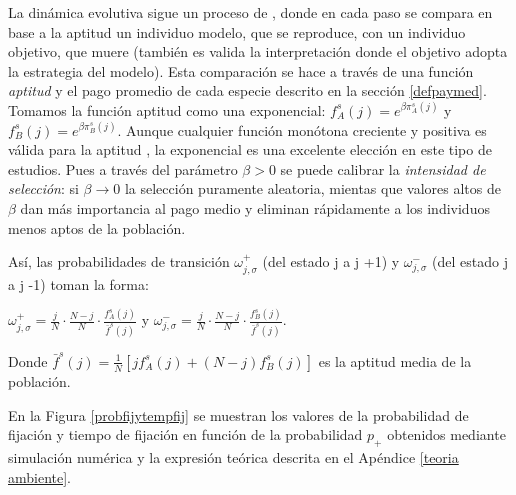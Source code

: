 \documentclass[%
 sor,
 jor,
 amsmath,amssymb,
 reprint,%
]{revtex4-2}
\begin{document}
La dinámica evolutiva sigue un proceso de  \cite{Moran1962}, donde en cada paso se compara en base a la aptitud un individuo modelo, que se reproduce, con un individuo objetivo, que muere (también es valida la interpretación donde el objetivo adopta la estrategia del modelo). Esta comparación se hace a través de una función \textit{aptitud} y el pago promedio de cada especie descrito en la sección \ref{defpaymed}. \\ 

Tomamos la función aptitud como una exponencial: $f^s_A(j) = e^{\beta \pi^s_A(j)}$ y $f^s_B(j) = e^{\beta \pi^s_B(j)}$.
Aunque cualquier función monótona creciente y positiva es válida para la aptitud \cite{Ashcroft2014}, la exponencial es una excelente elección en este tipo de estudios. Pues a través del parámetro $\beta > 0$ se puede calibrar la \textit{intensidad de selección}: si $\beta \to 0$ la selección puramente aleatoria, mientas que valores altos de $\beta$ dan más importancia al pago medio y eliminan rápidamente a los individuos menos aptos de la población.

Así, las probabilidades de transición $\omega^+_{j,\sigma}$ (del estado j a j +1) y $\omega^-_{j,\sigma}$ (del estado j a j -1) toman la forma: 

$\omega^+_{j,\sigma}=\frac{j}{N} \cdot \frac{N - j}{N} \cdot \frac{f^s_A(j)}{\bar{f}^s(j)}$ y $\omega^-_{j,\sigma} = \frac{j}{N} \cdot \frac{N - j}{N} \cdot \frac{f^s_B(j)}{\bar{f}^s(j)}$. 

Donde $\bar{f}^s(j) = \frac{1}{N} \left[ j f^s_A(j) + (N - j) f^s_B(j) \right]$ es la aptitud media de la población.

\vspace{0,2 cm}

En la Figura \ref{probfijytempfij} se muestran los valores de la probabilidad de fijación y tiempo de fijación en función de la probabilidad $p_+$ obtenidos mediante simulación numérica y la expresión teórica descrita en el Apéndice \ref{teoria ambiente}.
\end{document}
